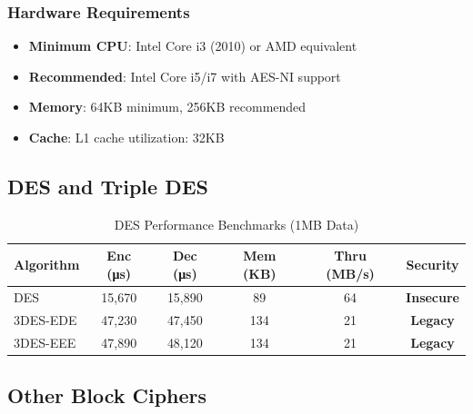 \documentclass[12pt,a4paper]{article}
\newcommand{\warning}[1]{\textcolor{warning}{\textbf{#1}}}
\newcommand{\error}[1]{\textcolor{error}{\textbf{#1}}}
\newcommand{\smalltable}[1]{\small #1}
\begin{document}
\subsubsection{Hardware Requirements}
\begin{itemize}
    \item \textbf{Minimum CPU}: Intel Core i3 (2010) or AMD equivalent
    \item \textbf{Recommended}: Intel Core i5/i7 with AES-NI support
    \item \textbf{Memory}: 64KB minimum, 256KB recommended
    \item \textbf{Cache}: L1 cache utilization: 32KB
\end{itemize}

\subsection{DES and Triple DES}

\begin{table}[h]
\centering
\smalltable{
\caption{DES Performance Benchmarks (1MB Data)}
\begin{tabular}{|l|c|c|c|c|c|}
\hline
\textbf{Algorithm} & \textbf{Enc (μs)} & \textbf{Dec (μs)} & \textbf{Mem (KB)} & \textbf{Thru (MB/s)} & \textbf{Security} \\
\hline
DES & 15,670 & 15,890 & 89 & 64 & \error{Insecure} \\
3DES-EDE & 47,230 & 47,450 & 134 & 21 & \warning{Legacy} \\
3DES-EEE & 47,890 & 48,120 & 134 & 21 & \warning{Legacy} \\
\hline
\end{tabular}
}
\end{table}

\subsection{Other Block Ciphers}
\end{document}
